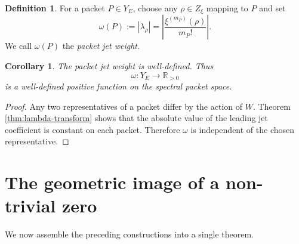 \documentclass[11pt,a4paper]{article}
\newtheorem{corollary}[theorem]{Corollary}
\theoremstyle{definition}
\newtheorem{definition}[theorem]{Definition}
\theoremstyle{remark}
\newcommand{\RR}{\mathbb R}
\begin{document}
\begin{definition}
For a packet $P\in Y_E$, choose any $\rho\in Z_\xi$ mapping to $P$ and set
\[
\omega(P):=|\lambda_\rho|=\left|\frac{\xi^{(m_P)}(\rho)}{m_P!}\right|.
\]
We call $\omega(P)$ the \emph{packet jet weight}.
\end{definition}

\begin{corollary}\label{cor:weight-well-defined}
The packet jet weight is well-defined.  Thus
\[
\omega:Y_E\longrightarrow \RR_{>0}
\]
is a well-defined positive function on the spectral packet space.
\end{corollary}

\begin{proof}
Any two representatives of a packet differ by the action of $W$.  Theorem \ref{thm:lambda-transform} shows that the absolute value of the leading jet coefficient is constant on each packet.  Therefore $\omega$ is independent of the chosen representative.
\end{proof}

\section{The geometric image of a non-trivial zero}

We now assemble the preceding constructions into a single theorem.
\end{document}
